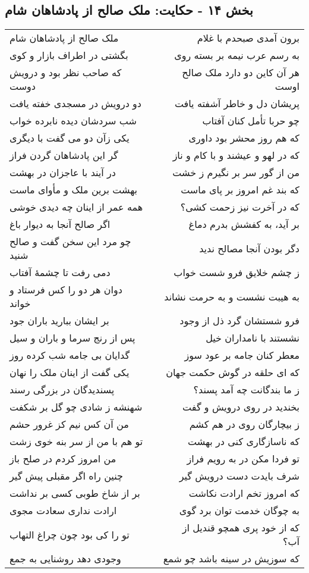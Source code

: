 \begin{center}
\section*{بخش ۱۴ - حکایت: ملک صالح از پادشاهان شام}
\label{sec:014}
\begin{longtable}{l p{0.5cm} r}
ملک صالح از پادشاهان شام
&&
برون آمدی صبحدم با غلام
\\
بگشتی در اطراف بازار و کوی
&&
به رسم عرب نیمه بر بسته روی
\\
که صاحب نظر بود و درویش دوست
&&
هر آن کاین دو دارد ملک صالح اوست
\\
دو درویش در مسجدی خفته یافت
&&
پریشان دل و خاطر آشفته یافت
\\
شب سردشان دیده نابرده خواب
&&
چو حربا تأمل کنان آفتاب
\\
یکی زآن دو می گفت با دیگری
&&
که هم روز محشر بود داوری
\\
گر این پادشاهان گردن فراز
&&
که در لهو و عیشند و با کام و ناز
\\
در آیند با عاجزان در بهشت
&&
من از گور سر بر نگیرم ز خشت
\\
بهشت برین ملک و مأوای ماست
&&
که بند غم امروز بر پای ماست
\\
همه عمر از اینان چه دیدی خوشی
&&
که در آخرت نیز زحمت کشی؟
\\
اگر صالح آنجا به دیوار باغ
&&
بر آید، به کفشش بدرم دماغ
\\
چو مرد این سخن گفت و صالح شنید
&&
دگر بودن آنجا مصالح ندید
\\
دمی رفت تا چشمهٔ آفتاب
&&
ز چشم خلایق فرو شست خواب
\\
دوان هر دو را کس فرستاد و خواند
&&
به هیبت نشست و به حرمت نشاند
\\
بر ایشان ببارید باران جود
&&
فرو شستشان گرد ذل از وجود
\\
پس از رنج سرما و باران و سیل
&&
نشستند با نامداران خیل
\\
گدایان بی جامه شب کرده روز
&&
معطر کنان جامه بر عود سوز
\\
یکی گفت از اینان ملک را نهان
&&
که ای حلقه در گوش حکمت جهان
\\
پسندیدگان در بزرگی رسند
&&
ز ما بندگانت چه آمد پسند؟
\\
شهنشه ز شادی چو گل بر شکفت
&&
بخندید در روی درویش و گفت
\\
من آن کس نیم کز غرور حشم
&&
ز بیچارگان روی در هم کشم
\\
تو هم با من از سر بنه خوی زشت
&&
که ناسازگاری کنی در بهشت
\\
من امروز کردم در صلح باز
&&
تو فردا مکن در به رویم فراز
\\
چنین راه اگر مقبلی پیش گیر
&&
شرف بایدت دست درویش گیر
\\
بر از شاخ طوبی کسی بر نداشت
&&
که امروز تخم ارادت نکاشت
\\
ارادت نداری سعادت مجوی
&&
به چوگان خدمت توان برد گوی
\\
تو را کی بود چون چراغ التهاب
&&
که از خود پری همچو قندیل از آب؟
\\
وجودی دهد روشنایی به جمع
&&
که سوزیش در سینه باشد چو شمع
\\
\end{longtable}
\end{center}
